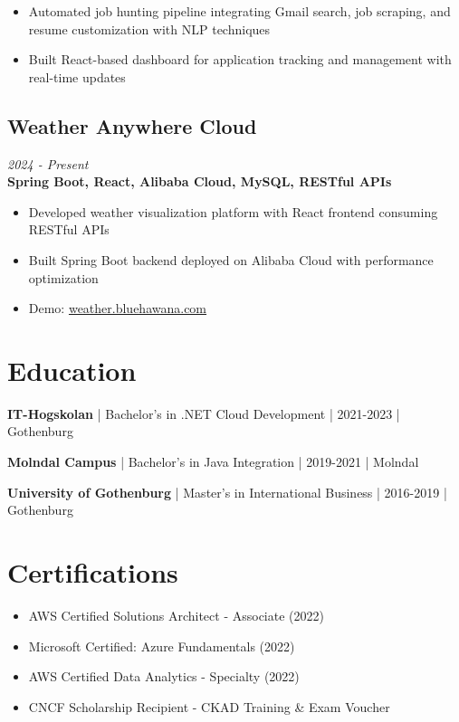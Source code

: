 \documentclass[11pt,a4paper]{article}
\begin{document}
\begin{itemize}[leftmargin=*, itemsep=2pt]
\item Automated job hunting pipeline integrating Gmail search, job scraping, and resume customization with NLP techniques
\item Built React-based dashboard for application tracking and management with real-time updates
\end{itemize}

\subsection*{Weather Anywhere Cloud}
\textit{2024 - Present} \\
\textbf{Spring Boot, React, Alibaba Cloud, MySQL, RESTful APIs}

\begin{itemize}[leftmargin=*, itemsep=2pt]
\item Developed weather visualization platform with React frontend consuming RESTful APIs
\item Built Spring Boot backend deployed on Alibaba Cloud with performance optimization
\item Demo: \href{https://weather.bluehawana.com}{weather.bluehawana.com}
\end{itemize}

\section*{Education}

\textbf{IT-Hogskolan} | Bachelor's in .NET Cloud Development | 2021-2023 | Gothenburg

\textbf{Molndal Campus} | Bachelor's in Java Integration | 2019-2021 | Molndal

\textbf{University of Gothenburg} | Master's in International Business | 2016-2019 | Gothenburg

\section*{Certifications}

\begin{itemize}[leftmargin=*, itemsep=2pt]
\item AWS Certified Solutions Architect - Associate (2022)
\item Microsoft Certified: Azure Fundamentals (2022)
\item AWS Certified Data Analytics - Specialty (2022)
\item CNCF Scholarship Recipient - CKAD Training \& Exam Voucher
\end{itemize}
\end{document}
